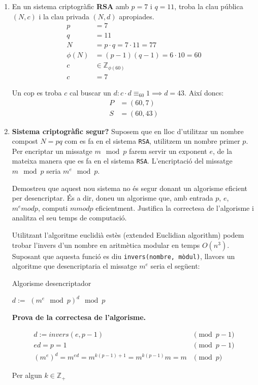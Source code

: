 \documentclass[a4paper]{article}
\begin{document}
\begin{enumerate}
\begin{enumerate}
\end{enumerate} 

\item En un sistema criptogràfic \textbf{RSA} amb $p = 7$ i $q = 11$, troba la clau pública $(N, c)$ i la clau privada $(N, d)$ apropiades.
\begin{align*}
	p &= 7 \\
	q &= 11 \\
	N &= p \cdot q = 7 \cdot 11 = 77 \\
	\phi(N) &= (p - 1)(q - 1) = 6 \cdot 10 = 60 \\
	c &\in \mathbb{Z}_{\phi(60)} \\
	c &= 7
\end{align*}

Un cop es troba $c$ cal buscar un $d : c \cdot d \equiv_{60} 1 \implies d = 43$. Així doncs:
\begin{align*}
	P &= (60, 7) \\
	S &= (60, 43)
\end{align*}

\item \textbf{Sistema criptogràfic segur?} Suposem que en lloc d'utilitzar un nombre compost $N = pq$ com es fa en el sistema \texttt{RSA}, utilitzem un nombre primer $p$. Per encriptar un missatge $m \mod p$ farem servir un exponent $e$, de la mateixa manera que es fa en el sistema \texttt{RSA}. L'encriptació del missatge $m \mod p$ seria $m^e \mod p$.

Demostreu que aquest nou sistema no és segur donant un algorisme eficient per
desencriptar. És a dir, doneu un algorisme que, amb entrada $p$, $e$, $m^e mod p$, computi $m mod p$ eficientment. Justifica la correctesa de l'algorisme i analitza el seu temps de computació.

Utilitzant l'algoritme euclidià estès (extended Euclidian algorithm) podem trobar l'invers d'un nombre en aritmètica modular en temps $O(n^3)$. Suposant que aquesta funció es diu \texttt{invers(nombre, mòdul)}, llavors un algoritme que desencriptaria el missatge $m^e$ seria el següent:

\begin{algorithm}[H]
	\caption{Algorisme desencriptador}
	\begin{algorithmic}
			\State $d :=$ 
			\State \Return $(m^e \mod p)^d \mod p$
		\EndFunction
	\end{algorithmic}
\end{algorithm}

\textbf{Prova de la correctesa de l'algorisme.}

\begin{align*}
	d := invers(e, p-1) &\pmod{p-1} \\
	e d = p = 1 &\pmod{p-1} \\
	(m^e)^d = m^{e d} = m^{k(p-1)+1} = m^{k(p-1)} m = m &\pmod{p}
\end{align*}

Per algun $k \in \mathbb{Z}_+$

\end{enumerate}
\end{document}
